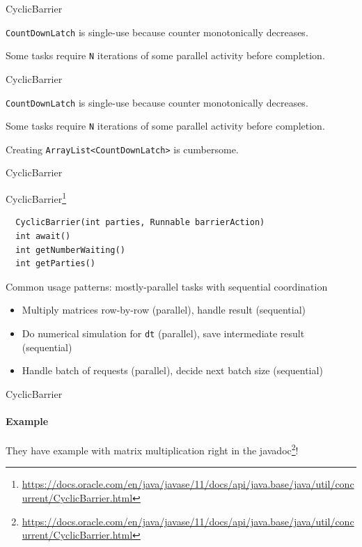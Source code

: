 \begin{frame}[t,fragile]{CyclicBarrier}

\texttt{CountDownLatch} is single-use because counter monotonically decreases. 

Some tasks require \texttt{N} iterations of some parallel activity before completion.
\end{frame}



\begin{frame}{CyclicBarrier}

\texttt{CountDownLatch} is single-use because counter monotonically decreases. 

Some tasks require \texttt{N} iterations of some parallel activity before completion.

Creating \texttt{ArrayList<CountDownLatch>} is cumbersome.

\end{frame}


\begin{frame}[fragile]{CyclicBarrier}

CyclicBarrier\footnote{\tiny\url{https://docs.oracle.com/en/java/javase/11/docs/api/java.base/java/util/concurrent/CyclicBarrier.html}}

\begin{verbatim}
  CyclicBarrier(int parties, Runnable barrierAction)
  int await()     
  int getNumberWaiting()  
  int getParties()    
\end{verbatim}

Common usage patterns: mostly-parallel tasks with sequential coordination
\begin{itemize}
    \item Multiply matrices row-by-row (parallel), handle result (sequential)
    \item Do numerical simulation for \texttt{dt} (parallel), save intermediate result (sequential)
    \item Handle batch of requests (parallel), decide next batch size (sequential)
\end{itemize}

\end{frame}

\begin{frame}[fragile]{CyclicBarrier}
\framesubtitle{Example}

They have example with matrix multiplication right in the javadoc\footnote{{\tiny\url{https://docs.oracle.com/en/java/javase/11/docs/api/java.base/java/util/concurrent/CyclicBarrier.html}}}!
\end{frame}



